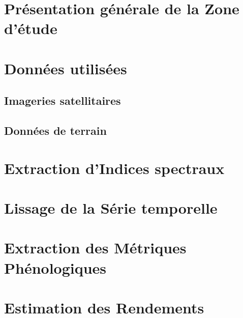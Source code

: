 \section{Présentation générale de la Zone d'étude}

\section{Données utilisées}

  \subsection{Imageries satellitaires}
  
  \subsection{Données de terrain}
  
\section{Extraction d'Indices spectraux}

\section{Lissage de la Série temporelle}

\section{Extraction des Métriques Phénologiques}

\section{Estimation des Rendements}